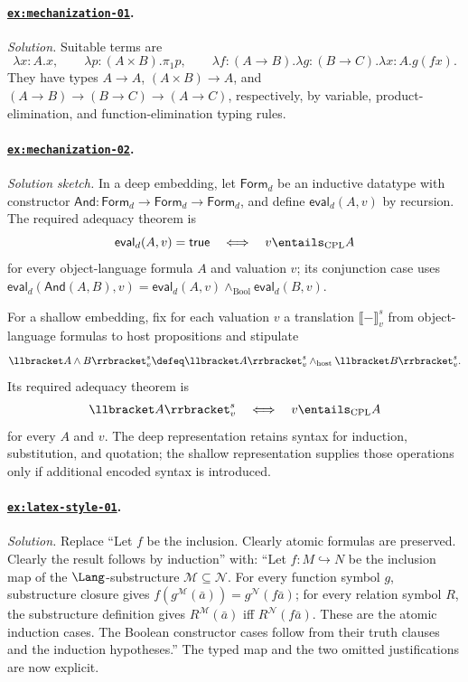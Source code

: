 \paragraph{\hyperref[ex:mechanization-01]{\texttt{ex:mechanization-01}}.}
\textit{Solution.}  Suitable terms are
\[
\lambda x{:}A.x,\qquad
\lambda p{:}(A\times B).\pi_1p,\qquad
\lambda f{:}(A\to B).\lambda g{:}(B\to C).\lambda x{:}A.g(fx).
\]
They have types \(A\to A\), \((A\times B)\to A\), and
\((A\to B)\to(B\to C)\to(A\to C)\), respectively, by variable,
product-elimination, and function-elimination typing rules.

\paragraph{\hyperref[ex:mechanization-02]{\texttt{ex:mechanization-02}}.}
\textit{Solution sketch.}  In a deep embedding, let
\(\mathsf{Form}_{d}\) be an inductive datatype with constructor
\(\mathsf{And}:\mathsf{Form}_{d}\to\mathsf{Form}_{d}\to\mathsf{Form}_{d}\),
and define \(\mathsf{eval}_{d}(A,v)\) by recursion.  The required adequacy
theorem is
\[
  \mathsf{eval}_{d}(A,v)=\mathsf{true}
  \quad\Longleftrightarrow\quad
  v\entails_{\mathrm{CPL}} A
\]
for every object-language formula \(A\) and valuation \(v\); its conjunction
case uses
\(\mathsf{eval}_{d}(\mathsf{And}(A,B),v)=
 \mathsf{eval}_{d}(A,v)\land_{\mathrm{Bool}}\mathsf{eval}_{d}(B,v)\).

For a shallow embedding, fix for each valuation \(v\) a translation
\(\llbracket-\rrbracket^{s}_{v}\) from object-language formulas to host
propositions and stipulate
\[
  \llbracket A\land B\rrbracket^{s}_{v}
  \defeq
  \llbracket A\rrbracket^{s}_{v}\land_{\mathrm{host}}
  \llbracket B\rrbracket^{s}_{v}.
\]
Its required adequacy theorem is
\[
  \llbracket A\rrbracket^{s}_{v}
  \quad\Longleftrightarrow\quad
  v\entails_{\mathrm{CPL}}A
\]
for every \(A\) and \(v\).  The deep representation retains syntax for
induction, substitution, and quotation; the shallow representation supplies
those operations only if additional encoded syntax is introduced.

\paragraph{\hyperref[ex:latex-style-01]{\texttt{ex:latex-style-01}}.}
\textit{Solution.}  Replace ``Let \(f\) be the inclusion.  Clearly atomic
formulas are preserved.  Clearly the result follows by induction'' with:
``Let \(f:M\hookrightarrow N\) be the inclusion map of the
\(\Lang\)-substructure \(\mathcal M\subseteq\mathcal N\).  For every function
symbol \(g\), substructure closure gives
\(f(g^{\mathcal M}(\bar a))=g^{\mathcal N}(f\bar a)\); for every relation
symbol \(R\), the substructure definition gives
\(R^{\mathcal M}(\bar a)\) iff \(R^{\mathcal N}(f\bar a)\).  These are the
atomic induction cases.  The Boolean constructor cases follow from their truth
clauses and the induction hypotheses.''  The typed map and the two omitted
justifications are now explicit.

